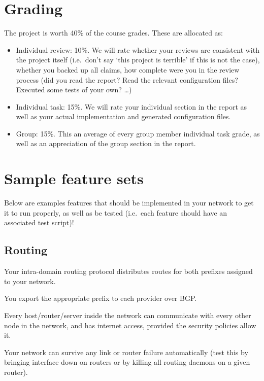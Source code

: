 \documentclass[a4paper,12pt]{article}
\begin{document}
\section{Grading}
The project is worth 40\% of the course grades. These are allocated as:
\begin{itemize}
    \item Individual review: 10\%. We will rate whether your reviews are
        consistent with the project itself (i.e.\ don't say `this project is
        terrible' if this is not the case), whether you backed up all claims, how
        complete were you in the review process (did you read the report? Read
        the relevant configuration files? Executed some tests of your own?
        \dots)
    \item Individual task: 15\%. We will rate your individual section in the
        report as well as your actual implementation and generated
        configuration files.
    \item Group: 15\%. This an average of every group member individual task
        grade, as well as an appreciation of the group section in the report.
\end{itemize}

\section{Sample feature sets}
Below are examples features that should be implemented in your network to get
it to run properly, as well as be tested
(i.e.\ each feature should have an associated test script)!

\subsection{Routing}
\begin{checklist}
    \item Your intra-domain routing protocol distributes routes for both
        prefixes assigned to your network.
    \item You export the appropriate prefix to each provider over BGP.\@
    \item Every host/router/server inside the network can communicate with 
        every other node in the network, and has internet access, provided the 
        security policies allow it.
    \item Your network can survive any link or router failure automatically
        (test this by bringing interface down on routers or by killing all
        routing daemons on a given router).
\end{checklist}
\end{document}
